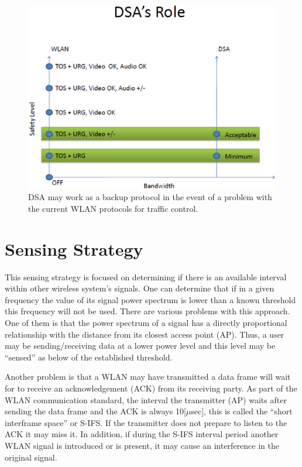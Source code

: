 \documentclass[conference]{ieeeconf}
\begin{document}
\begin{figure}[htp] 
\centering
\includegraphics[width=1\columnwidth, scale=0.6]{dsaRole}
\caption{DSA may work as a backup protocol in the event of a problem with the current WLAN protocols for traffic control.}
\label{fig:dsaRole}
\end{figure}

\section{Sensing Strategy}
\label{sec:sensing}
This sensing strategy is focused on determining if there is an available interval within other wireless system's signals.
One can determine that if in a given frequency the value of its signal power spectrum is lower than a known threshold this frequency will not be used.
There are various problems with this approach.
One of them is that the power spectrum of a signal has a directly proportional relationship with the distance from its closest access point (AP).
Thus, a user may be sending/receiving data at a lower power level and this level may be ``sensed'' as below of the established threshold.

Another problem is that a WLAN may have transmitted a data frame will wait for to receive an acknowledgement (ACK) from its receiving party.
As part of the WLAN communication standard, the interval the transmitter (AP) waits after sending the data frame and the ACK is always 10[$\mu$sec], this is called the ``short interframe space'' or S-IFS.
If the transmitter does not prepare to listen to the ACK it may miss it.
In addition, if during the S-IFS interval period another WLAN signal is introduced or is present, it may cause an interference in the original signal.
\end{document}
